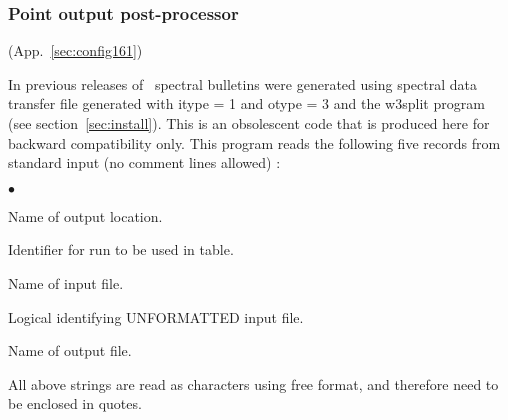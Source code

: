 \vsssub
\subsubsection{Point output post-processor} \label{sec:ww3outp}
\vsssub

 (App.~\ref{sec:config161})

\vspace{\baselineskip} 
\vspace{\baselineskip} 
\noindent 
In previous releases of \ws\ spectral bulletins were generated using spectral
data transfer file generated with {\F itype = 1} and {\F otype = 3} and the
{\file w3split} program (see section~\ref{sec:install}). This is an
obsolescent code that is produced here for backward compatibility only.  This
program reads the following five records from standard input (no comment lines
allowed) :

\begin{list}{$\bullet$}{\itemsep 0mm \parsep 0mm}
\item Name of output location.
\item Identifier for run to be used in table.
\item Name of input file.
\item Logical identifying UNFORMATTED input file.
\item Name of output file.
\end{list}

\noindent
All above strings are read as characters using free format, and therefore need
to be enclosed in quotes.

\pb
